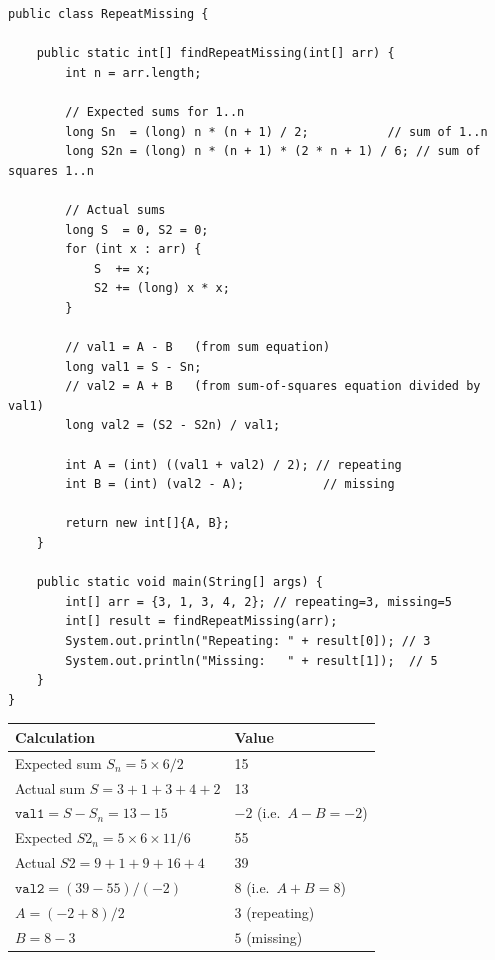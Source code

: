 \documentclass[12pt,a4paper,oneside]{book}
\begin{document}
\begin{lstlisting}[caption={Repeating and Missing --- Math approach, O(n) time O(1) space}]
public class RepeatMissing {

    public static int[] findRepeatMissing(int[] arr) {
        int n = arr.length;

        // Expected sums for 1..n
        long Sn  = (long) n * (n + 1) / 2;           // sum of 1..n
        long S2n = (long) n * (n + 1) * (2 * n + 1) / 6; // sum of squares 1..n

        // Actual sums
        long S  = 0, S2 = 0;
        for (int x : arr) {
            S  += x;
            S2 += (long) x * x;
        }

        // val1 = A - B   (from sum equation)
        long val1 = S - Sn;
        // val2 = A + B   (from sum-of-squares equation divided by val1)
        long val2 = (S2 - S2n) / val1;

        int A = (int) ((val1 + val2) / 2); // repeating
        int B = (int) (val2 - A);           // missing

        return new int[]{A, B};
    }

    public static void main(String[] args) {
        int[] arr = {3, 1, 3, 4, 2}; // repeating=3, missing=5
        int[] result = findRepeatMissing(arr);
        System.out.println("Repeating: " + result[0]); // 3
        System.out.println("Missing:   " + result[1]);  // 5
    }
}
\end{lstlisting}

\begin{dryrun}[arr = \{3, 1, 3, 4, 2\}, n = 5]
\begin{center}
\begin{tabular}{ll}
\toprule
\textbf{Calculation} & \textbf{Value}\\
\midrule
Expected sum $S_n = 5 \times 6/2$        & 15\\
Actual sum $S = 3+1+3+4+2$               & 13\\
$\texttt{val1} = S - S_n = 13 - 15$        & $-2$ \quad (i.e.\ $A - B = -2$)\\
Expected $S2_n = 5 \times 6 \times 11/6$ & 55\\
Actual $S2 = 9+1+9+16+4$                 & 39\\
$\texttt{val2} = (39-55)/(-2)$             & $8$ \quad (i.e.\ $A + B = 8$)\\
$A = (-2 + 8)/2$                         & $3$ (repeating)\\
$B = 8 - 3$                              & $5$ (missing)\\
\bottomrule
\end{tabular}
\end{center}
\end{dryrun}
\end{document}
